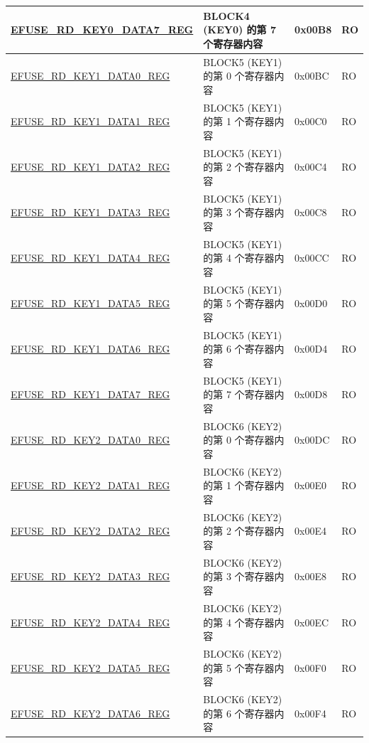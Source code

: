 \begin{longtable}{ | p{5.8cm} | p{7cm} | p{1.3cm} | p{1.2cm} | }
\hyperref[regdesc:EFUSERDKEY0DATA7REG]{EFUSE\_RD\_KEY0\_DATA7\_REG} & BLOCK4 (KEY0) 的第 7 个寄存器内容 & 0x00B8 & RO \\ \hline
\hyperref[regdesc:EFUSERDKEY1DATA0REG]{EFUSE\_RD\_KEY1\_DATA0\_REG} & BLOCK5 (KEY1) 的第 0 个寄存器内容 & 0x00BC & RO \\ \hline
\hyperref[regdesc:EFUSERDKEY1DATA1REG]{EFUSE\_RD\_KEY1\_DATA1\_REG} & BLOCK5 (KEY1) 的第 1 个寄存器内容 & 0x00C0 & RO \\ \hline
\hyperref[regdesc:EFUSERDKEY1DATA2REG]{EFUSE\_RD\_KEY1\_DATA2\_REG} & BLOCK5 (KEY1) 的第 2 个寄存器内容 & 0x00C4 & RO \\ \hline
\hyperref[regdesc:EFUSERDKEY1DATA3REG]{EFUSE\_RD\_KEY1\_DATA3\_REG} & BLOCK5 (KEY1) 的第 3 个寄存器内容 & 0x00C8 & RO \\ \hline
\hyperref[regdesc:EFUSERDKEY1DATA4REG]{EFUSE\_RD\_KEY1\_DATA4\_REG} & BLOCK5 (KEY1) 的第 4 个寄存器内容 & 0x00CC & RO \\ \hline
\hyperref[regdesc:EFUSERDKEY1DATA5REG]{EFUSE\_RD\_KEY1\_DATA5\_REG} & BLOCK5 (KEY1) 的第 5 个寄存器内容 & 0x00D0 & RO \\ \hline
\hyperref[regdesc:EFUSERDKEY1DATA6REG]{EFUSE\_RD\_KEY1\_DATA6\_REG} & BLOCK5 (KEY1) 的第 6 个寄存器内容 & 0x00D4 & RO \\ \hline
\hyperref[regdesc:EFUSERDKEY1DATA7REG]{EFUSE\_RD\_KEY1\_DATA7\_REG} & BLOCK5 (KEY1) 的第 7 个寄存器内容 & 0x00D8 & RO \\ \hline
\hyperref[regdesc:EFUSERDKEY2DATA0REG]{EFUSE\_RD\_KEY2\_DATA0\_REG} & BLOCK6 (KEY2) 的第 0 个寄存器内容 & 0x00DC & RO \\ \hline
\hyperref[regdesc:EFUSERDKEY2DATA1REG]{EFUSE\_RD\_KEY2\_DATA1\_REG} & BLOCK6 (KEY2) 的第 1 个寄存器内容 & 0x00E0 & RO \\ \hline
\hyperref[regdesc:EFUSERDKEY2DATA2REG]{EFUSE\_RD\_KEY2\_DATA2\_REG} & BLOCK6 (KEY2) 的第 2 个寄存器内容 & 0x00E4 & RO \\ \hline
\hyperref[regdesc:EFUSERDKEY2DATA3REG]{EFUSE\_RD\_KEY2\_DATA3\_REG} & BLOCK6 (KEY2) 的第 3 个寄存器内容 & 0x00E8 & RO \\ \hline
\hyperref[regdesc:EFUSERDKEY2DATA4REG]{EFUSE\_RD\_KEY2\_DATA4\_REG} & BLOCK6 (KEY2) 的第 4 个寄存器内容 & 0x00EC & RO \\ \hline
\hyperref[regdesc:EFUSERDKEY2DATA5REG]{EFUSE\_RD\_KEY2\_DATA5\_REG} & BLOCK6 (KEY2) 的第 5 个寄存器内容 & 0x00F0 & RO \\ \hline
\hyperref[regdesc:EFUSERDKEY2DATA6REG]{EFUSE\_RD\_KEY2\_DATA6\_REG} & BLOCK6 (KEY2) 的第 6 个寄存器内容 & 0x00F4 & RO \\ \hline

\end{longtable}
